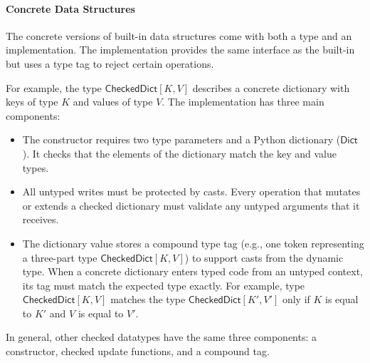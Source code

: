 \documentclass[english,cleveref,submission]{programming}
\newcommand{\typefont}[1]{\mathsf{#1}}
\newcommand{\paramtype}[2]{#1[#2]}
\newcommand{\sptrawpydict}{\typefont{Dict}}
\newcommand{\sptrawchkdict}{\typefont{CheckedDict}} %
\newcommand{\sptchkdict}[2]{\paramtype{\sptrawchkdict}{#1, #2}}
\begin{document}


\paragraph{Concrete Data Structures}
\label{s:chkdict-impl}

The concrete versions of built-in data structures come with both a type and an
implementation.
The implementation provides the same interface as the built-in but uses a
type tag to reject certain operations.

For example, the type $\sptchkdict{K}{V}$ describes a concrete dictionary
with keys of type $K$ and values of type $V$.
The implementation has three main components:
\begin{itemize}
  \item
    The constructor requires two type parameters and a Python dictionary ($\sptrawpydict$).
    It checks that the elements of the dictionary match the key and value types.
  \item
    All untyped writes must be protected by casts.
    Every operation that mutates or extends a checked dictionary must
    validate any untyped arguments that it receives.
  \item
    The dictionary value stores a compound type tag 
    (e.g., one token representing a three-part type $\sptchkdict{K}{V}$)
    to support casts from the dynamic type.
    When a concrete dictionary enters typed code from an untyped context,
    its tag must match the expected type exactly.
    For example, type $\sptchkdict{K}{V}$ matches the type
    $\sptchkdict{K'}{V'}$ only if $K$ is equal to $K'$
    and $V$ is equal to $V'$.
\end{itemize}
%
In general, other checked datatypes have the same three components:
a constructor, checked update functions, and a compound tag.
\end{document}
